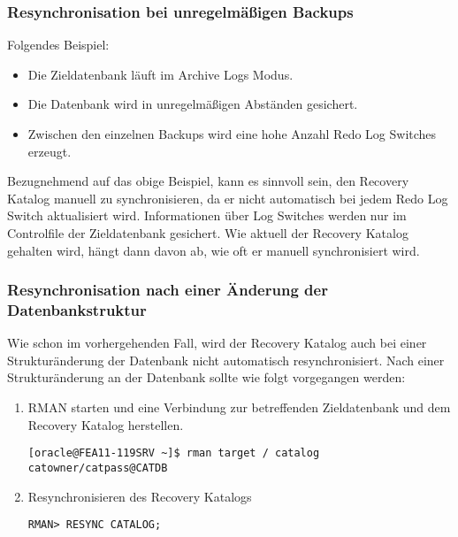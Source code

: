        \subsubsection{Resynchronisation bei unregelmäßigen Backups}
          Folgendes Beispiel:
          \begin{itemize}
            \item Die Zieldatenbank läuft im Archive Logs Modus.
            \item Die Datenbank wird in unregelmäßigen Abständen gesichert.
            \item Zwischen den einzelnen Backups wird eine hohe Anzahl Redo Log Switches erzeugt.
          \end{itemize}
          Bezugnehmend auf das obige Beispiel, kann es sinnvoll sein, den Recovery Katalog manuell zu synchronisieren, da er nicht automatisch bei jedem Redo Log Switch aktualisiert wird. Informationen über Log Switches werden nur im Controlfile der Zieldatenbank gesichert. Wie aktuell der Recovery Katalog gehalten wird, hängt dann davon ab, wie oft er manuell synchronisiert wird.
        \subsubsection{Resynchronisation nach einer Änderung der Datenbankstruktur}
          Wie schon im vorhergehenden Fall, wird der Recovery Katalog auch bei
          einer Struk\-tur\-än\-der\-ung der Datenbank nicht automatisch
          resynchronisiert. Nach einer Strukturänderung an der Datenbank
          sollte wie folgt vorgegangen werden:
\clearpage
          \begin{enumerate}
            \item RMAN starten und eine Verbindung zur betreffenden Zieldatenbank und dem Recovery Katalog herstellen.
              \begin{lstlisting}[caption={Starten des RMAN},label=admin1215,language=rman]
[oracle@FEA11-119SRV ~]$ rman target / catalog catowner/catpass@CATDB
              \end{lstlisting}
            \item Resynchronisieren des Recovery Katalogs
              \begin{lstlisting}[caption={Resynchronisieren des Recovery Katalogs},label=admin1216,language=rman]
RMAN> RESYNC CATALOG;
              \end{lstlisting}
          \end{enumerate}
